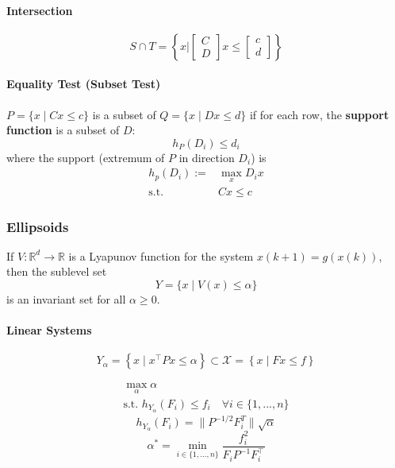 \paragraph{Intersection}
\noindent
\begin{equation*}
    S \cap T = \left\{x \Bigg|\begin{bmatrix}
        C \\D
    \end{bmatrix}x \leq \begin{bmatrix}
        c \\d
    \end{bmatrix}\right\}
\end{equation*}

\paragraph{Equality Test (Subset Test)}
$P=\{x\mid Cx\leq c\}$ is a subset of $Q=\{x\mid Dx\leq d\}$ if for each row, the \textbf{support function} is a subset of $D$:
\begin{equation*}
    h_P(D_i) \leq d_i
\end{equation*}
where the support (extremum of $P$ in direction $D_i$) is
\begin{align*}
    h_p(D_i) :=     & \max_x D_i x \\
    \mathrm{s.t.}\; & Cx\leq c
\end{align*}

\subsubsection{Ellipsoids}
If $V:\mathbb{R}^d\to\mathbb{R}$ is a Lyapunov function for the system $x(k+1)=g(x(k))$, then the sublevel set
\begin{equation*}
    Y = \{x\mid V(x)\leq \alpha\}
\end{equation*}
is an invariant set for all $\alpha \geq 0$.

\paragraph{Linear Systems}
\noindent
\begin{equation*}
    Y_\alpha = \left\{x\mid x^\top Px\leq \alpha\right\} \subset \mathcal{X}= \left\{x\mid Fx\leq f\right\}
\end{equation*}

\noindent
\begin{gather*}
    \max_{\alpha}\alpha \\
    \text{s.t. }h_{Y_{\alpha}}(F_{i})\leq f_{i} \quad \forall i\in\{1,...,n\}
\end{gather*}
\begin{equation*}
    h_{Y_\alpha}(F_i)=\|P^{-1/2}F_i^T\|\sqrt{\alpha}
\end{equation*}
\noindent
\begin{equation*}
    \alpha^* = \min_{i\in \{1,\ldots, n\}} \frac{f_i^2}{F_i P^{-1} F_i^\top}
\end{equation*}